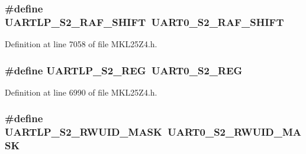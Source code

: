 \subsubsection[{\texorpdfstring{U\+A\+R\+T\+L\+P\+\_\+\+S2\+\_\+\+R\+A\+F\+\_\+\+S\+H\+I\+FT}{UARTLP_S2_RAF_SHIFT}}]{\setlength{\rightskip}{0pt plus 5cm}\#define U\+A\+R\+T\+L\+P\+\_\+\+S2\+\_\+\+R\+A\+F\+\_\+\+S\+H\+I\+FT~{\bf U\+A\+R\+T0\+\_\+\+S2\+\_\+\+R\+A\+F\+\_\+\+S\+H\+I\+FT}}\hypertarget{group___backward___compatibility___symbols_ga135975b0721bd170915cd4337759dfd7}{}\label{group___backward___compatibility___symbols_ga135975b0721bd170915cd4337759dfd7}


Definition at line 7058 of file M\+K\+L25\+Z4.\+h.

\subsubsection[{\texorpdfstring{U\+A\+R\+T\+L\+P\+\_\+\+S2\+\_\+\+R\+EG}{UARTLP_S2_REG}}]{\setlength{\rightskip}{0pt plus 5cm}\#define U\+A\+R\+T\+L\+P\+\_\+\+S2\+\_\+\+R\+EG~{\bf U\+A\+R\+T0\+\_\+\+S2\+\_\+\+R\+EG}}\hypertarget{group___backward___compatibility___symbols_ga3dad8bbcd2c68c9f43962eb233e845a5}{}\label{group___backward___compatibility___symbols_ga3dad8bbcd2c68c9f43962eb233e845a5}


Definition at line 6990 of file M\+K\+L25\+Z4.\+h.

\subsubsection[{\texorpdfstring{U\+A\+R\+T\+L\+P\+\_\+\+S2\+\_\+\+R\+W\+U\+I\+D\+\_\+\+M\+A\+SK}{UARTLP_S2_RWUID_MASK}}]{\setlength{\rightskip}{0pt plus 5cm}\#define U\+A\+R\+T\+L\+P\+\_\+\+S2\+\_\+\+R\+W\+U\+I\+D\+\_\+\+M\+A\+SK~{\bf U\+A\+R\+T0\+\_\+\+S2\+\_\+\+R\+W\+U\+I\+D\+\_\+\+M\+A\+SK}}\hypertarget{group___backward___compatibility___symbols_ga467467c8bbe352103ff116334710d766}{}\label{group___backward___compatibility___symbols_ga467467c8bbe352103ff116334710d766}


